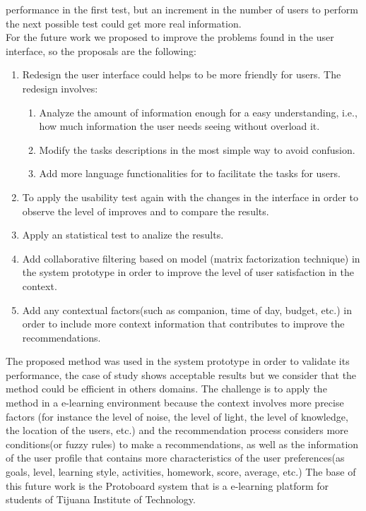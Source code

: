 performance in the first test, but an increment in the number of users
to perform the next possible test could get more real information.\\
For the future work we proposed to improve the problems found 
in the user interface, so the proposals are the following:
\begin{enumerate} 
\item  Redesign the user interface could helps to be more friendly for
users. The redesign involves:
  \begin{enumerate}  
  \item Analyze the amount of information enough for a easy understanding, 
  i.e., how much information the user needs seeing without overload it.
  \item Modify the tasks descriptions in the most simple way to avoid 
  confusion.
  \item Add more language functionalities for to facilitate the tasks 
  for users.
  \end{enumerate}
\item To apply the usability test again with the changes in the interface 
in order to observe the level of improves and to compare the results. 
\item Apply an statistical test to analize the results.
\item Add collaborative filtering based on model (matrix
factorization technique) in the system prototype in order to improve 
the level of user satisfaction in the context.
\item Add any contextual factors(such as companion, time of day, 
budget, etc.) in order to include more context information that contributes
to improve the recommendations.
\end{enumerate}
The proposed method was used in the system prototype in order to
validate its performance, the case of study shows acceptable results
but we consider that the method could be efficient in others domains.
The challenge is to apply the method in a e-learning environment
because the context involves more precise factors (for instance the
level of noise, the level of light, the level of knowledge, the location 
of the users, etc.) and the recommendation process considers more 
conditions(or fuzzy rules) to make a recommendations, as well as the information 
of the user profile that contains more characteristics of the user
preferences(as goals, level, learning style, activities, homework,
score, average, etc.) The base of this future work is the Protoboard
system\cite{garcia2007simple} that is a e-learning platform
for students of Tijuana Institute of Technology.






